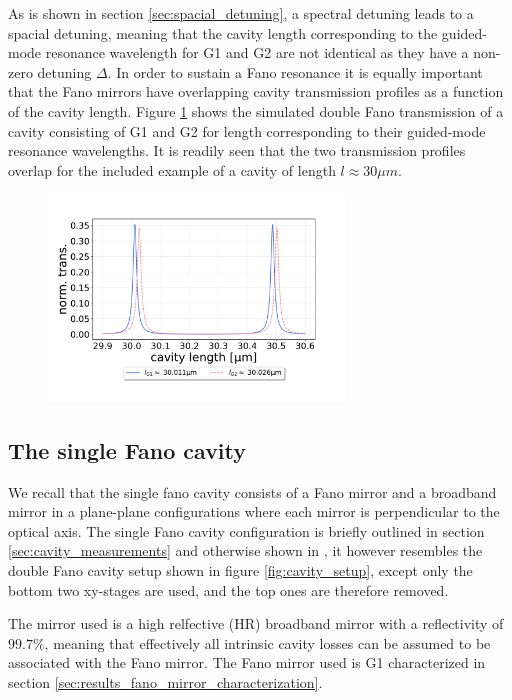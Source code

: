 As is shown in section \ref{sec:spacial_detuning}, a spectral detuning leads to a spacial detuning, meaning that the cavity length corresponding to the guided-mode resonance wavelength for G1 and G2 are not identical as they have a non-zero detuning $\Delta$. In order to sustain a Fano resonance it is equally important that the Fano mirrors have overlapping cavity transmission profiles as a function of the cavity length. Figure \ref{fig:G1/G2_length_scan} shows the simulated double Fano transmission of a cavity consisting of G1 and G2 for length corresponding to their guided-mode resonance wavelengths. It is readily seen that the two transmission profiles overlap for the included example of a cavity of length $l \approx 30 \mu m$.

\begin{figure}[h!]
    \centering
    \includegraphics[width=0.7\textwidth]{figures/results/M3:M5_length_scan_sim_30um.pdf}
    \caption{}
    \label{fig:G1/G2_length_scan}
\end{figure}


\subsection{The single Fano cavity}\label{sec:the_single_fano_cavity_results}

We recall that the single fano cavity consists of a Fano mirror and a broadband mirror in a plane-plane configurations where each mirror is perpendicular to the optical axis. The single Fano cavity configuration is briefly outlined in section \ref{sec:cavity_measurements} and otherwise shown in \cite{Mitra}, it however resembles the double Fano cavity setup shown in figure \ref{fig:cavity_setup}, except only the bottom two xy-stages are used, and the top ones are therefore removed.   

The mirror used is a high relfective (HR) broadband mirror with a reflectivity of $99.7\%$, meaning that effectively all intrinsic cavity losses can be assumed to be associated with the Fano mirror. The Fano mirror used is G1 characterized in section \ref{sec:results_fano_mirror_characterization}. 

